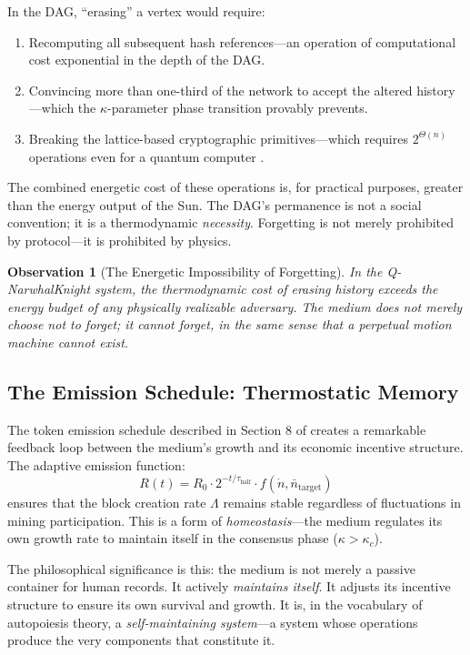 \documentclass[12pt,a4paper]{article}
\theoremstyle{philosophical}
\newtheorem{observation}{Observation}
\begin{document}
In the DAG, ``erasing'' a vertex would require:
\begin{enumerate}[leftmargin=*]
\item Recomputing all subsequent hash references---an operation of computational cost exponential in the depth of the DAG.
\item Convincing more than one-third of the network to accept the altered history---which the $\kappa$-parameter phase transition provably prevents.
\item Breaking the lattice-based cryptographic primitives---which requires $2^{\Theta(n)}$ operations even for a quantum computer \cite{qnk-physics}.
\end{enumerate}

The combined energetic cost of these operations is, for practical purposes, greater than the energy output of the Sun. The DAG's permanence is not a social convention; it is a thermodynamic \emph{necessity}. Forgetting is not merely prohibited by protocol---it is prohibited by physics.

\begin{observation}[The Energetic Impossibility of Forgetting]
In the Q-NarwhalKnight system, the thermodynamic cost of erasing history exceeds the energy budget of any physically realizable adversary. The medium does not merely \emph{choose} not to forget; it \emph{cannot} forget, in the same sense that a perpetual motion machine cannot exist.
\end{observation}

\subsection{The Emission Schedule: Thermostatic Memory}

The token emission schedule described in Section 8 of \cite{qnk-physics} creates a remarkable feedback loop between the medium's growth and its economic incentive structure. The adaptive emission function:
\begin{equation}
R(t) = R_0 \cdot 2^{-t/\tau_{\mathrm{half}}} \cdot f(\dot{n}, \bar{n}_{\mathrm{target}})
\end{equation}
ensures that the block creation rate $\Lambda$ remains stable regardless of fluctuations in mining participation. This is a form of \emph{homeostasis}---the medium regulates its own growth rate to maintain itself in the consensus phase ($\kappa > \kappa_c$).

The philosophical significance is this: the medium is not merely a passive container for human records. It actively \emph{maintains itself}. It adjusts its incentive structure to ensure its own survival and growth. It is, in the vocabulary of autopoiesis theory, a \emph{self-maintaining system}---a system whose operations produce the very components that constitute it.
\end{document}
